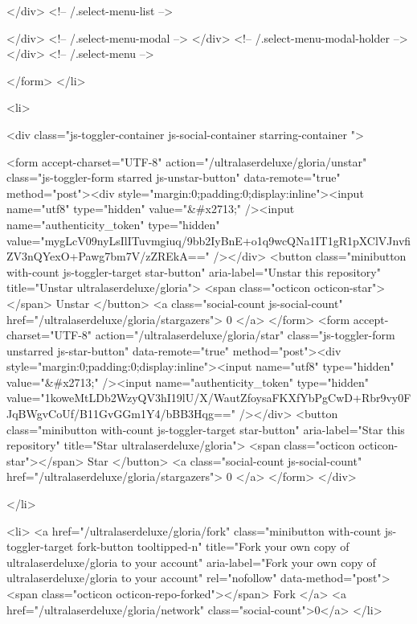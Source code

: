           </div> <!-- /.select-menu-list -->

        </div> <!-- /.select-menu-modal -->
      </div> <!-- /.select-menu-modal-holder -->
    </div> <!-- /.select-menu -->

</form>
    </li>

  <li>
    
  <div class="js-toggler-container js-social-container starring-container ">

    <form accept-charset="UTF-8" action="/ultralaserdeluxe/gloria/unstar" class="js-toggler-form starred js-unstar-button" data-remote="true" method="post"><div style="margin:0;padding:0;display:inline"><input name="utf8" type="hidden" value="&#x2713;" /><input name="authenticity_token" type="hidden" value="mygLcV09nyLsIlITuvmgiuq/9bb2IyBnE+o1q9wcQNa1IT1gR1pXClVJnvfiZV3nQYexO+Pawg7bm7V/zZREkA==" /></div>
      <button
        class="minibutton with-count js-toggler-target star-button"
        aria-label="Unstar this repository" title="Unstar ultralaserdeluxe/gloria">
        <span class="octicon octicon-star"></span>
        Unstar
      </button>
        <a class="social-count js-social-count" href="/ultralaserdeluxe/gloria/stargazers">
          0
        </a>
</form>
    <form accept-charset="UTF-8" action="/ultralaserdeluxe/gloria/star" class="js-toggler-form unstarred js-star-button" data-remote="true" method="post"><div style="margin:0;padding:0;display:inline"><input name="utf8" type="hidden" value="&#x2713;" /><input name="authenticity_token" type="hidden" value="1koweMtLDb2WzyQV3hI19lU/X/WautZfoysaFKXfYbPgCwD+Rbr9vy0FJqBWgvCoUf/B11GvGGm1Y4/bBB3Hqg==" /></div>
      <button
        class="minibutton with-count js-toggler-target star-button"
        aria-label="Star this repository" title="Star ultralaserdeluxe/gloria">
        <span class="octicon octicon-star"></span>
        Star
      </button>
        <a class="social-count js-social-count" href="/ultralaserdeluxe/gloria/stargazers">
          0
        </a>
</form>  </div>

  </li>


        <li>
          <a href="/ultralaserdeluxe/gloria/fork" class="minibutton with-count js-toggler-target fork-button tooltipped-n" title="Fork your own copy of ultralaserdeluxe/gloria to your account" aria-label="Fork your own copy of ultralaserdeluxe/gloria to your account" rel="nofollow" data-method="post">
            <span class="octicon octicon-repo-forked"></span>
            Fork
          </a>
          <a href="/ultralaserdeluxe/gloria/network" class="social-count">0</a>
        </li>


